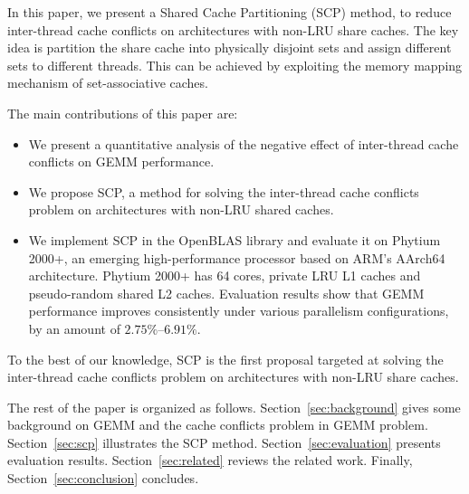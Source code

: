 In this paper, we present a Shared Cache Partitioning (SCP) method,
to reduce inter-thread cache conflicts on architectures with non-LRU share caches.
The key idea is partition the share cache into physically disjoint sets
and assign different sets to different threads. This can be achieved by
exploiting the memory mapping mechanism of set-associative caches.

The main contributions of this paper are:
\begin{itemize}
\item We present a quantitative analysis of the negative effect of inter-thread cache
  conflicts on GEMM performance.
\item We propose SCP, a method for solving the inter-thread cache conflicts
  problem on architectures with non-LRU shared caches.
\item We implement SCP in the OpenBLAS library and evaluate it on Phytium 2000+,
  an emerging high-performance processor based on ARM's AArch64 architecture.
  Phytium 2000+ has 64 cores, private LRU L1 caches
  and pseudo-random shared L2 caches.
  Evaluation results show that GEMM performance improves consistently
  under various parallelism configurations, by an amount of $2.75\%$--$6.91\%$.
\end{itemize}

To the best of our knowledge, SCP is the first proposal targeted at
solving the inter-thread cache conflicts problem on
architectures with non-LRU share caches.

The rest of the paper is organized as follows.
Section~\ref{sec:background} gives some background on GEMM and
the cache conflicts problem in GEMM problem.
Section~\ref{sec:scp} illustrates the SCP method.
Section~\ref{sec:evaluation} presents evaluation results.
Section~\ref{sec:related} reviews the related work.
Finally, Section~\ref{sec:conclusion} concludes.
